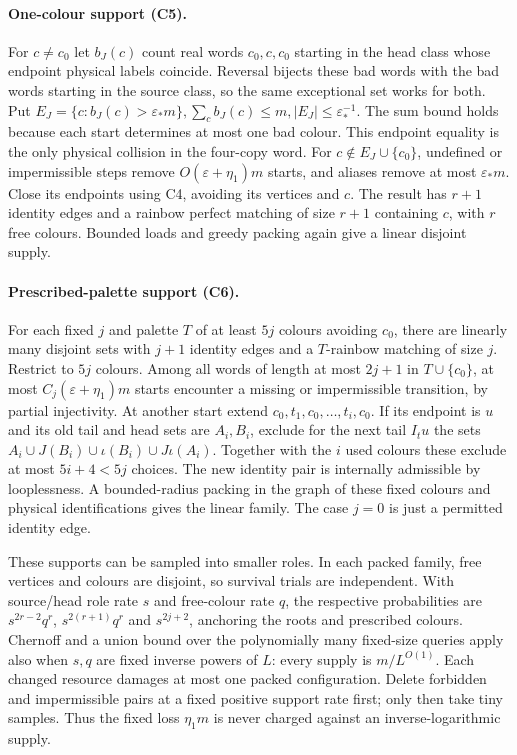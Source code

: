 \paragraph{One-colour support (C5).}
For $c\ne{}c_0$ let $b_J(c)$ count real words $c_0,c,c_0$ starting in the head class whose endpoint physical labels coincide.
Reversal bijects these bad words with the bad words starting in
the source class, so the same exceptional set works for both. Put $E_J=\{c:b_J(c)>\varepsilon_*m\},\sum_cb_J(c)\le{}m,|E_J|\le\varepsilon_*^{-1}$. The sum bound holds because each start determines at most one bad
colour.  This endpoint equality is the only physical collision in
the four-copy word.  For $c\notin{}E_J\cup\{c_0\}$, undefined or impermissible steps remove $O(\varepsilon+\eta_1)m$ starts, and aliases remove at most $\varepsilon_*m$.  Close its endpoints using C4, avoiding its vertices and $c$.  The result has $r+1$ identity edges and a rainbow perfect matching of size $r+1$ containing $c$, with $r$ free colours.  Bounded loads and greedy packing again give a linear disjoint supply.

\paragraph{Prescribed-palette support (C6).}
For each fixed $j$ and palette $T$ of at least $5j$ colours avoiding $c_0$, there are linearly many disjoint sets with $j+1$ identity edges and a $T$-rainbow matching of size $j$.  Restrict to $5j$ colours.  Among all words of length at most $2j+1$ in $T\cup\{c_0\}$, at most $C_j(\varepsilon+\eta_1)m$ starts encounter a missing or impermissible transition, by partial injectivity.  At another start
extend $c_0,t_1,c_0,\ldots,t_i,c_0$.  If its endpoint is $u$ and its old tail and head sets are $A_i,B_i$, exclude for the next tail $I_tu$ the sets $A_i\cup{}J(B_i)\cup\iota(B_i)\cup{}J\iota(A_i)$. Together with the $i$ used colours these exclude at most $5i+4<5j$ choices.  The new identity pair is internally admissible by looplessness.  A bounded-radius packing in the graph of these
fixed colours and physical identifications gives the linear family.
The case $j=0$ is just a permitted identity edge.

These supports can be sampled into smaller roles.  In each packed
family, free vertices and colours are disjoint, so survival trials
are independent.  With source/head role rate $s$ and free-colour rate $q$, the respective probabilities are $s^{2r-2}q^r$, $s^{2(r+1)}q^r$ and $s^{2j+2}$, anchoring the roots and prescribed colours.  Chernoff and a union bound over
the polynomially many fixed-size queries apply also when $s,q$ are fixed inverse powers of $L$: every supply is $m/L^{O(1)}$. Each changed resource damages at most one packed configuration.
Delete forbidden and impermissible pairs at a fixed positive support
rate first; only then take tiny samples.  Thus the fixed loss $\eta_1m$ is never charged against an inverse-logarithmic supply.

